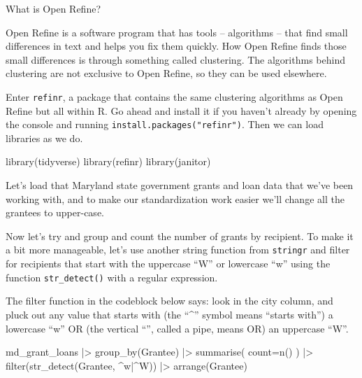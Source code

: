 \documentclass[
  letterpaper,
  DIV=11,
  numbers=noendperiod]{scrreprt}
\newenvironment{Shaded}{\begin{snugshade}}{\end{snugshade}}
\newcommand{\AttributeTok}[1]{\textcolor[rgb]{0.40,0.45,0.13}{#1}}
\newcommand{\FunctionTok}[1]{\textcolor[rgb]{0.28,0.35,0.67}{#1}}
\newcommand{\NormalTok}[1]{\textcolor[rgb]{0.00,0.23,0.31}{#1}}
\newcommand{\SpecialCharTok}[1]{\textcolor[rgb]{0.37,0.37,0.37}{#1}}
\newcommand{\StringTok}[1]{\textcolor[rgb]{0.13,0.47,0.30}{#1}}
\begin{document}
What is Open Refine?

Open Refine is a software program that has tools -- algorithms -- that
find small differences in text and helps you fix them quickly. How Open
Refine finds those small differences is through something called
clustering. The algorithms behind clustering are not exclusive to Open
Refine, so they can be used elsewhere.

Enter \texttt{refinr}, a package that contains the same clustering
algorithms as Open Refine but all within R. Go ahead and install it if
you haven't already by opening the console and running
\texttt{install.packages("refinr")}. Then we can load libraries as we
do.

\begin{Shaded}
\begin{Highlighting}[]
\FunctionTok{library}\NormalTok{(tidyverse)}
\FunctionTok{library}\NormalTok{(refinr)}
\FunctionTok{library}\NormalTok{(janitor)}
\end{Highlighting}
\end{Shaded}

Let's load that Maryland state government grants and loan data that
we've been working with, and to make our standardization work easier
we'll change all the grantees to upper-case.

Now let's try and group and count the number of grants by recipient. To
make it a bit more manageable, let's use another string function from
\texttt{stringr} and filter for recipients that start with the uppercase
``W'' or lowercase ``w'' using the function \texttt{str\_detect()} with
a regular expression.

The filter function in the codeblock below says: look in the city
column, and pluck out any value that starts with (the ``\^{}'' symbol
means ``starts with'') a lowercase ``w'' OR (the vertical
``\textbar{}'', called a pipe, means OR) an uppercase ``W''.

\begin{Shaded}
\begin{Highlighting}[]
\NormalTok{md\_grant\_loans }\SpecialCharTok{|\textgreater{}}
  \FunctionTok{group\_by}\NormalTok{(Grantee) }\SpecialCharTok{|\textgreater{}}
  \FunctionTok{summarise}\NormalTok{(}
    \AttributeTok{count=}\FunctionTok{n}\NormalTok{()}
\NormalTok{  ) }\SpecialCharTok{|\textgreater{}}
  \FunctionTok{filter}\NormalTok{(}\FunctionTok{str\_detect}\NormalTok{(Grantee, }\StringTok{\textquotesingle{}\^{}w|\^{}W\textquotesingle{}}\NormalTok{)) }\SpecialCharTok{|\textgreater{}}
  \FunctionTok{arrange}\NormalTok{(Grantee)}
\end{Highlighting}
\end{Shaded}
\end{document}
